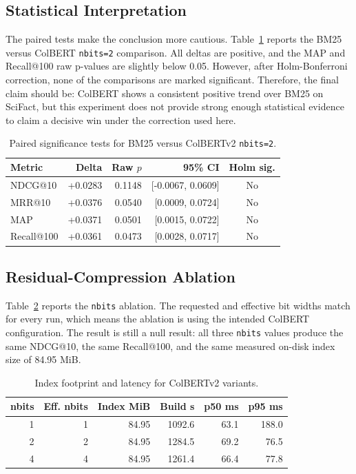 \documentclass[sigconf,nonacm]{acmart}
\begin{document}
\subsection{Statistical Interpretation}

The paired tests make the conclusion more cautious. Table~\ref{tab:stats}
reports the BM25 versus ColBERT \texttt{nbits=2} comparison. All deltas are
positive, and the MAP and Recall@100 raw p-values are slightly below 0.05.
However, after Holm-Bonferroni correction, none of the comparisons are marked
significant. Therefore, the final claim should be: ColBERT shows a consistent
positive trend over BM25 on SciFact, but this experiment does not provide strong
enough statistical evidence to claim a decisive win under the correction used
here.

\begin{table}[h]
  \centering
  \caption{Paired significance tests for BM25 versus ColBERTv2 \texttt{nbits=2}.}
  \label{tab:stats}
  \begin{tabular}{lrrrc}
    \toprule
    Metric & Delta & Raw $p$ & 95\% CI & Holm sig. \\
    \midrule
    NDCG@10 & +0.0283 & 0.1148 & [-0.0067, 0.0609] & No \\
    MRR@10 & +0.0376 & 0.0540 & [0.0009, 0.0724] & No \\
    MAP & +0.0371 & 0.0501 & [0.0015, 0.0722] & No \\
    Recall@100 & +0.0361 & 0.0473 & [0.0028, 0.0717] & No \\
    \bottomrule
  \end{tabular}
\end{table}

\subsection{Residual-Compression Ablation}

Table~\ref{tab:latency} reports the \texttt{nbits} ablation. The requested and
effective bit widths match for every run, which means the ablation is using the
intended ColBERT configuration. The result is still a null result: all three
\texttt{nbits} values produce the same NDCG@10, the same Recall@100, and the
same measured on-disk index size of 84.95 MiB.

\begin{table}[h]
  \centering
  \caption{Index footprint and latency for ColBERTv2 variants.}
  \label{tab:latency}
  \begin{tabular}{rrrrrr}
    \toprule
    nbits & Eff. nbits & Index MiB & Build s & p50 ms & p95 ms \\
    \midrule
    1 & 1 & 84.95 & 1092.6 & 63.1 & 188.0 \\
    2 & 2 & 84.95 & 1284.5 & 69.2 & 76.5 \\
    4 & 4 & 84.95 & 1261.4 & 66.4 & 77.8 \\
    \bottomrule
  \end{tabular}
\end{table}
\end{document}
